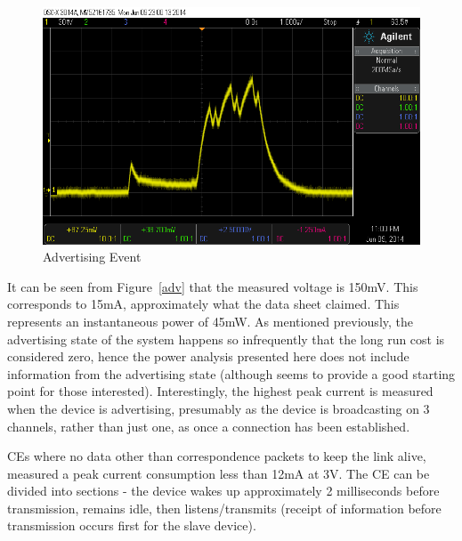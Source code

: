 \documentclass[]{article}
\begin{document}
\begin{figure}[htb]
	\begin{center}
		\includegraphics[width = \textwidth]{adv}
	\end{center}
	\caption{Advertising Event}
	\label{fig:adv}
\end{figure}

It can be seen from Figure~\ref{adv} that the measured voltage is 150mV. This corresponds to 15mA, approximately what the data sheet claimed. This represents an instantaneous power of 45mW. As mentioned previously, the advertising state of the system happens so infrequently that the long run cost is considered zero, hence the power analysis presented here does not include information from the advertising state (although \cite{Liu2012} seems to provide a good starting point for those interested). Interestingly, the highest peak current is measured when the device is advertising, presumably as the device is broadcasting on 3 channels, rather than just one, as once a connection has been established. 

\ac{CE}s where no data other than correspondence packets to keep the link alive, measured a peak current consumption less than 12mA at 3V. The \ac{CE} can be divided into sections - the device wakes up approximately 2 milliseconds before transmission, remains idle, then listens/transmits (receipt of information before transmission occurs first for the slave device). 
\end{document}
